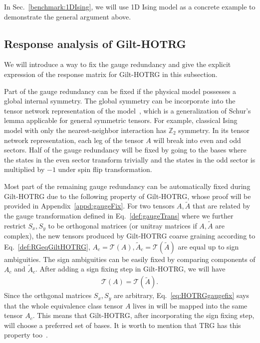 \documentclass[aps,prb,reprint,superscriptaddress]{revtex4-2}
\begin{document}
In Sec.~\ref{benchmark:1DIsing}, we will use 1D Ising model as a
concrete example to demonstrate the general argument above.
%

\subsection{Response analysis of Gilt-HOTRG\label{RespAnaGiltHOTRG}}
We will introduce a way to fix the gauge redundancy and give the
explicit expression of the response matrix for Gilt-HOTRG in this
subsection.
%

Part of the gauge redundancy can be fixed if the physical model
possesses a global internal symmetry. The global symmetry can be
incorporate into the tensor network representation of the
model~\cite{Singh2010SymTen,Singh2011U1Ten,Singh2012SU2Ten}, which is a
generalization of Schur's lemma applicable for general symmetric
tensors. For example, classical Ising model with only the
nearest-neighbor interaction has $\mathbb{Z}_2$ symmetry. In its tensor
network representation, each leg of the tensor $A$ will break into even
and odd sectors. Half of the gauge redundancy will be fixed by going to
the bases where the states in the even sector transform trivially and
the states in the odd sector is multiplied by $-1$ under spin flip
transformation.
%

Most part of the remaining gauge redundancy can be automatically fixed
during Gilt-HOTRG due to the following property of Gilt-HOTRG, whose
proof will be provided in Appendix~\ref{appd:gaugeFix}. For two tensors
$A, \tilde{A}$ that are related by the gauge transformation defined in
Eq.~\eqref{def:gaugeTrans} where we further restrict $S_x,S_y$ to be
orthogonal matrices (or unitray matrices if $A, \tilde{A}$ are complex),
the new tensors produced by Gilt-HOTRG coarse graining according to
Eq.~\eqref{def:RGeqGiltHOTRG}, $A_c = \mathcal{T}\left(A\right),
\tilde{A}_c = \mathcal{T}(\tilde{A})$ are equal up to sign ambiguities.
The sign ambiguities can be easily fixed by comparing components of
$A_c$ and $\tilde{A}_c$. After adding a sign fixing step in Gilt-HOTRG,
we will have
%
\begin{align}\label{eq:HOTRGgaugefix}
    \mathcal{T}(A) = \mathcal{T}(\tilde{A}).
\end{align}
%
Since the orthgonal matrices $S_x, S_y$ are arbitrary,
Eq.~\eqref{eq:HOTRGgaugefix} says that the whole equivalence class tensor
$A$ lives in will be mapped into the same tensor $A_c$. This means
that Gilt-HOTRG, after incorporating the sign fixing step, will choose a
preferred set of bases. It is worth to mention that TRG has this
property too~\cite{kadanoff2014}.
%
\end{document}
